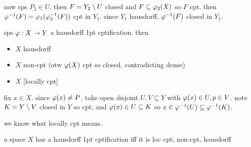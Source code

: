 now sps $P_{2}\in U$.
then $F=Y_{2}\setminus U$ closed and $F\subseteq\varphi_{2}(X)$ so $F$ cpt.
then $\varphi^{-1}(F)=\varphi_{1}(\varphi_{2}^{-1}(F))$ cpt in $Y_{1}$.
since $Y_{1}$ hausdorff, $\varphi^{-1}(F)$ closed in $Y_{1}$.

\begin{prop}
    sps $\varphi:X\rightarrow Y$ a hausdorff 1pt cptification. then
    \begin{itemize}
        \item $X$ hausdorff
        \item $X$ non-cpt (otw $\varphi(X)$ cpt so closed, contradicting dense)
        \item $X$ [locally cpt]
    \end{itemize}
\end{prop}

\begin{pf}[source=Primary Source Material]
    fix $x\in X$.
    since $\varphi(x)\neq P$, take open disjoint $U,V\subseteq Y$ with
    $\varphi(x)\in U,p\in V$.
    note $K=Y\setminus V$ closed in $Y$ so cpt, and
    $\varphi(x)\in U\subseteq K$ so $x\in\varphi^{-1}(U)\subseteq\varphi^{-1}(K)$.
\end{pf}

we know what locally cpt means.

\begin{prop}
    a space $X$ has a hausdorff 1pt cptification iff it is loc cpt, non-cpt,
    hausdorff
\end{prop}

